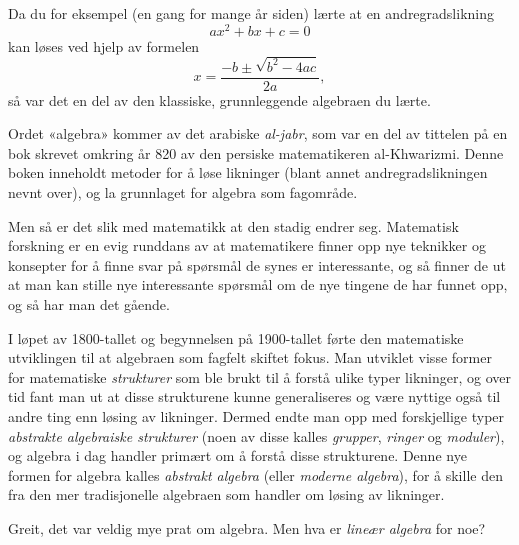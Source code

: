 \smallskip

Da du for eksempel (en gang for mange år siden) lærte at en
andregradslikning
\[
ax^2 + bx + c = 0
\]
kan løses ved hjelp av formelen
\[
x = \frac{-b \pm \sqrt{b^2 - 4ac}}{2a},
\]
så var det en del av den klassiske, grunnleggende algebraen du lærte.

\smallskip

Ordet «algebra» kommer av det arabiske \emph{al-jabr}, som var en del
av tittelen på en bok skrevet omkring år 820 av den persiske
matematikeren al-Khwarizmi.  Denne boken inneholdt metoder for å løse
likninger (blant annet andregradslikningen nevnt over), og la
grunnlaget for algebra som fagområde.

Men så er det slik med matematikk at den stadig endrer seg.
Matematisk forskning er en evig runddans av at matematikere finner opp
nye teknikker og konsepter for å finne svar på spørsmål de synes er
interessante, og så finner de ut at man kan stille nye interessante
spørsmål om de nye tingene de har funnet opp, og så har man det
gående.

I løpet av 1800-tallet og begynnelsen på 1900-tallet førte den
matematiske utviklingen til at algebraen som fagfelt skiftet fokus.
Man utviklet visse former for matematiske \emph{strukturer} som ble
brukt til å forstå ulike typer likninger, og over tid fant man ut at
disse strukturene kunne generaliseres og være nyttige også til andre
ting enn løsing av likninger.  Dermed endte man opp med forskjellige
typer \emph{abstrakte algebraiske strukturer} (noen av disse kalles
\emph{grupper}, \emph{ringer} og \emph{moduler}), og algebra i dag
handler primært om å forstå disse strukturene.  Denne nye formen for
algebra kalles \emph{abstrakt algebra} (eller \emph{moderne algebra}),
for å skille den fra den mer tradisjonelle algebraen som handler om
løsing av likninger.


\medskip
Greit, det var veldig mye prat om algebra.  Men hva er \emph{lineær
  algebra} for noe?

